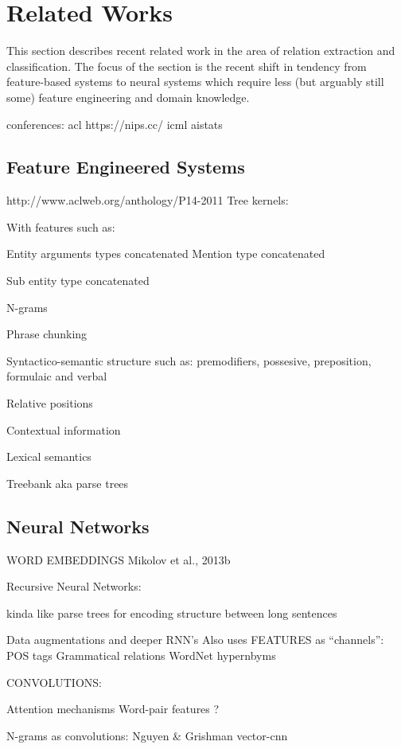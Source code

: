 
\section{Related Works}

This section describes recent related work in the area of relation extraction and classification. The focus of the section is the recent shift in tendency from feature-based systems to neural systems which require less (but arguably still some) feature engineering and domain knowledge.  


conferences:
acl
https://nips.cc/
icml
aistats

\subsection{Feature Engineered Systems}

http://www.aclweb.org/anthology/P14-2011
Tree kernels: 

With features such as:

Entity arguments types concatenated
Mention type concatenated

Sub entity type concatenated

N-grams

Phrase chunking 

Syntactico-semantic structure such as: premodifiers, possesive, preposition, formulaic and verbal

Relative positions

Contextual information

Lexical semantics

Treebank aka parse trees 

\subsection{Neural Networks}

WORD EMBEDDINGS
Mikolov et al., 2013b


Recursive Neural Networks:

kinda like parse trees for encoding structure between long sentences

Data augmentations and deeper RNN's
Also uses FEATURES as ``channels'':
POS tags
Grammatical relations
WordNet hypernbyms


CONVOLUTIONS:

Attention mechanisms
Word-pair features ? 

N-grams as convolutions:
Nguyen & Grishman
vector-cnn

